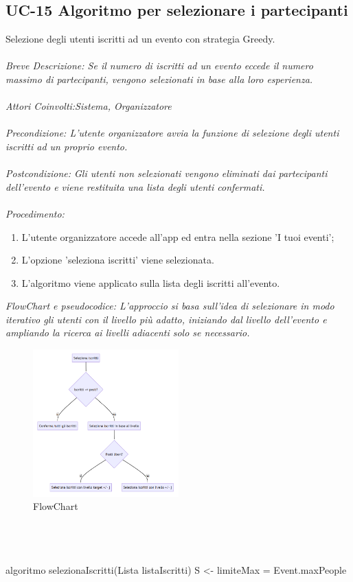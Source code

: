\subsection{UC-15 Algoritmo per selezionare i partecipanti}
Selezione degli utenti iscritti ad un evento con strategia Greedy.
\\
\\
\textit{Breve Descrizione: Se il numero di iscritti ad un evento eccede il numero massimo di partecipanti, vengono selezionati in base alla loro esperienza.} 
\\
\\
\textit{Attori Coinvolti:Sistema, Organizzatore}
\\
\\
\textit{Precondizione: L'utente organizzatore avvia la funzione di selezione degli utenti iscritti ad un proprio evento.}
\\
\\
\textit{Postcondizione: Gli utenti non selezionati vengono eliminati dai partecipanti dell'evento e viene restituita una lista degli utenti confermati.}
\\
\\
\textit{Procedimento:}
\begin{enumerate}
	\item L'utente organizzatore accede all'app ed entra nella sezione 'I tuoi eventi';
 	\item L'opzione 'seleziona iscritti' viene selezionata.
	\item L'algoritmo viene applicato sulla lista degli iscritti all'evento.
\end{enumerate}
\textit{FlowChart e pseudocodice: L'approccio si basa sull'idea di selezionare in modo iterativo gli utenti con il livello più
adatto, iniziando dal livello dell'evento e ampliando la ricerca ai livelli adiacenti solo se
necessario.}
\\
\begin{figure}[htb]
    \centering
    \includegraphics[width = 0.5\textwidth]{images/flowchart.png}
    \caption{FlowChart}
	\label{fig:FlowChart}
\end{figure}
\\
\\
\\
algoritmo selezionaIscritti(Lista listaIscritti) 
    S <- {}
    limiteMax = Event.maxPeople
    
